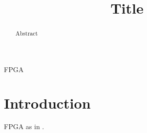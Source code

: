 \documentclass[conference, a5paper]{IEEEtran}
\begin{document}
\title{Title}

\author{
}
\maketitle

\begin{abstract}
    Abstract
\end{abstract}

\begin{IEEEkeywords}
    FPGA
\end{IEEEkeywords}

\glsresetall

\section{Introduction}
\gls{FPGA} as in \cite{9217847}.


\end{document}
